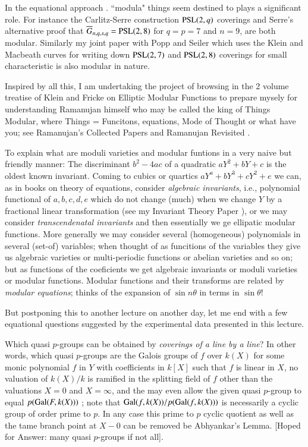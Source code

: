 In the equational approach . ``modula" things seem destined to plays a significant role. For instance the Carlitz-Serre construction $\operatorname{PSL}(2,q)$ coverings and Serre's alternative proof \cite{chap1-key57} that $\overline{G}_{n,q,s,q} = \operatorname{PSL}(2,8)$ for $q=p=7$ and $n=9$, are both modular. Similarly my joint paper \cite{chap1-key16} with Popp and Seiler which uses the Klein and Macbeath curves for writing down $\operatorname{PSL} (2,7)$ and $\operatorname{PSL} (2,8)$  coverings for small characteristic is also modular in nature. 

Inspired by all this, I am undertaking the project of browsing in the 2 volume treatise of Klein and Fricke \cite{chap1-key43} on Elliptic Modular Functions to prepare mysely for understanding Ramanujan himself who may be called the king of Things Modular, where Things = Funcitons, equations, Mode of Thought or what have you; see Ramanujan's Collected Papers \cite{chap1-key50} and Ramanujan Revisited \cite{chap1-key15}. 

To explain what are moduli varieties and modular funtions in a very naive but friendly manner: The discriminant $b^{2}-4ac$ of a quadratic $aY^{2}+bY+c$ is the oldest known invariant. Coming to cubics or quartics $aY^{a} + bY^{3} +cY^{2} +e$ we can, as in books on theory of equations, consider \textit{algebraic invariants}, i.e., polynomial functional of $a,b,c,d,e$ which do not change (much) when we change $Y$ by a fractional linear transformation (see my Invariant Theory Paper \cite{chap1-key13}), or we may consider \textit{transcendenatal invariants} and then essentially we ge ellipatic modular functions. More generally we may consider several (homogeneous) polynomials in several (set-of) variables; when thought of as funcitions of the variables they give us algebraic varieties or multi-periodic functions or abelian varieties and so on; but as functions of the coeficients we get algebraic invariants or moduli varieties or modular functions. Modular functions and their transforms are related by \textit{modular equations}; thinks of the expansion of $\sin n\theta$ in terms in $\sin \theta$!

But postponing this to another lecture on another day, let me end with a few equational questions suggested by the experimental data presented in this lecture.
\begin{question}\label{chap1-qus9.1}
Which quasi $p$-groups can be obtained by \textit{coverings of a line by a line}? In other words, which quasi $p$-groups are the Galois groups of $f$ over $k(X)$ for some monic polynomial $f$ in $Y$ with coefficients in $k[X]$ such that $f$ is linear in $X$, no valuation of $k(X)/k$ is ramified in the splitting field of $f$ other than the valuations $X=0$ and $X=\infty$, and the may even allow the given quasi $p$-group to equal $p(\operatorname{Gal}(F, k(X)))$ ; note that $\operatorname{Gal}(f, k(X))/p(\operatorname{Gal}(f,k(X)))$ is necessarily a cyclic group of order prime to $p$. In any case this prime to $p$ cyclic quotient as well as the tame branch point at $X-0$ can be removed be Abhyankar's Lemma. [Hoped for Answer: many quasi $p$-groups if not all].
\end{question}

